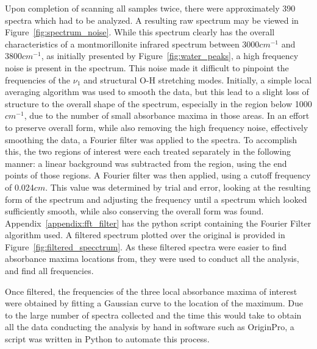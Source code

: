 Upon completion of scanning all samples twice, there were approximately 390 spectra which had to be analyzed. A resulting raw spectrum may be viewed in Figure~\ref{fig:spectrum_noise}. While this spectrum clearly has the overall characteristics of a montmorillonite infrared spectrum between 3000$cm^{-1}$ and 3800$cm^{-1}$, as initially presented by Figure~\ref{fig:water_peaks}, a high frequency noise is present in the spectrum. This noise made it difficult to pinpoint the frequencies of the $\nu_1$ and structural O-H stretching modes. Initially, a simple local averaging algorithm was used to smooth the data, but this lead to a slight loss of structure to the overall shape of the spectrum, especially in the region below 1000$cm^{-1}$, due to the number of small absorbance maxima in those areas. In an effort to preserve overall form, while also removing the high frequency noise, effectively smoothing the data, a Fourier filter was applied to the spectra. To accomplish this, the two regions of interest were each treated separately in the following manner: a linear background was subtracted from the region, using the end points of those regions. A Fourier filter was then applied, using a cutoff frequency of 0.024$cm$. This value was determined by trial and error, looking at the resulting form of the spectrum and adjusting the frequency until a spectrum which looked sufficiently smooth, while also conserving the overall form was found. Appendix~\ref{appendix:fft_filter} has the python script containing the Fourier Filter algorithm used. A filtered spectrum plotted over the original is provided in Figure~\ref{fig:filtered_specctrum}. As these filtered spectra were easier to find absorbance maxima locations from, they were used to conduct all the analysis, and find all frequencies.

Once filtered, the frequencies of the three local absorbance maxima of interest were obtained by fitting a Gaussian curve to the location of the maximum. Due to the large number of spectra collected and the time this would take to obtain all the data conducting the analysis by hand in software such as OriginPro, a script was written in Python to automate this process.

